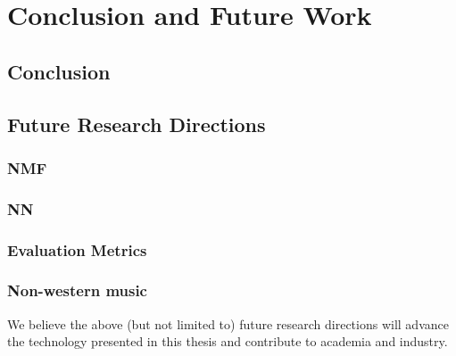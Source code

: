 \chapter{Conclusion and Future Work}
\label{ch:concl}

\section{Conclusion}

\lipsum[1-3]

\section{Future Research Directions}

\lipsum[4]

\subsection{NMF}

\lipsum[5]

\subsection{NN}

\lipsum[6]

\subsection{Evaluation Metrics}

\lipsum[7]

\subsection{Non-western music}

\lipsum[8]

\vspace{2em}
We believe the above (but not limited to) future research directions will advance the technology presented in this thesis and contribute to academia and industry.
